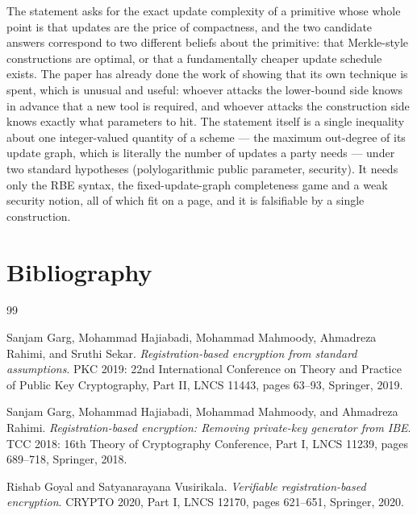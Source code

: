 \documentclass{aicr-conjecture}
\begin{document}
\begin{remark}\label{rem:interest}
The statement asks for the exact update complexity of a primitive whose
whole point is that updates are the price of compactness, and the two
candidate answers correspond to two different beliefs about the
primitive: that Merkle-style constructions are optimal, or that a
fundamentally cheaper update schedule exists. The paper has already done
the work of showing that its own technique is spent, which is unusual
and useful: whoever attacks the lower-bound side knows in advance that a
new tool is required, and whoever attacks the construction side knows
exactly what parameters to hit. The statement itself is a single
inequality about one integer-valued quantity of a scheme --- the maximum
out-degree of its update graph, which is literally the number of updates
a party needs --- under two standard hypotheses (polylogarithmic public
parameter, security). It needs only the RBE syntax, the
fixed-update-graph completeness game and a weak security notion, all of
which fit on a page, and it is falsifiable by a single construction.
\end{remark}

\section{Bibliography}

\begin{aicrbibliography}{99}

Sanjam Garg, Mohammad Hajiabadi, Mohammad Mahmoody, Ahmadreza Rahimi,
and Sruthi Sekar.
\emph{Registration-based encryption from standard assumptions}.
PKC 2019: 22nd International Conference on Theory and Practice of Public
Key Cryptography, Part II, LNCS 11443, pages 63--93, Springer, 2019.

Sanjam Garg, Mohammad Hajiabadi, Mohammad Mahmoody, and Ahmadreza
Rahimi.
\emph{Registration-based encryption: Removing private-key generator from
IBE}.
TCC 2018: 16th Theory of Cryptography Conference, Part I, LNCS 11239,
pages 689--718, Springer, 2018.

Rishab Goyal and Satyanarayana Vusirikala.
\emph{Verifiable registration-based encryption}.
CRYPTO 2020, Part I, LNCS 12170, pages 621--651, Springer, 2020.

\end{aicrbibliography}
\end{document}
